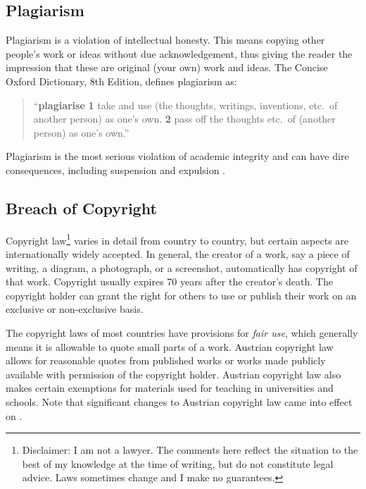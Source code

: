 \subsection{Plagiarism}

Plagiarism is a violation of intellectual honesty. This means copying
other people's work or ideas without due acknowledgement, thus giving
the reader the impression that these are original (your own) work and
ideas. The Concise Oxford Dictionary, 8th Edition, defines plagiarism
as:
\begin{quotation}
\noindent
``\textbf{plagiarise}
\textbf{1} take and use (the thoughts, writings, inventions, etc.\ of
another person) as one's own. \textbf{2} pass off the thoughts etc.\
of (another person) as one's own.''
\end{quotation}
Plagiarism is the most serious violation of academic integrity and can
have dire consequences, including suspension and expulsion
\citep{Reisman2005}.



\subsection{Breach of Copyright}

Copyright law\footnote{Disclaimer: I am not a lawyer. The comments
  here reflect the situation to the best of my knowledge at the time
  of writing, but do not constitute legal advice. Laws sometimes
  change and I make no guarantees.} varies in detail from country to
country, but certain aspects are internationally widely accepted. In
general, the creator of a work, say a piece of writing, a diagram, a
photograph, or a screenshot, automatically has copyright of that
work. Copyright usually expires 70 years after the creator's
death. The copyright holder can grant the right for others to use or
publish their work on an exclusive or non-exclusive basis.

The copyright laws of most countries have provisions for \emph{fair
  use}, which generally means it is allowable to quote small parts of
a work. Austrian copyright law \citep[§ 42f]{UrhG} allows for
reasonable quotes from published works or works made publicly
available with permission of the copyright holder. Austrian copyright
law \citep[§ 42g]{UrhG} also makes certain exemptions for materials
used for teaching in universities and schools. Note that significant
changes to Austrian copyright law \citep{UrhG-Novelle-2015} came into
effect on \yearmonthday{2015}{10}{1}.





